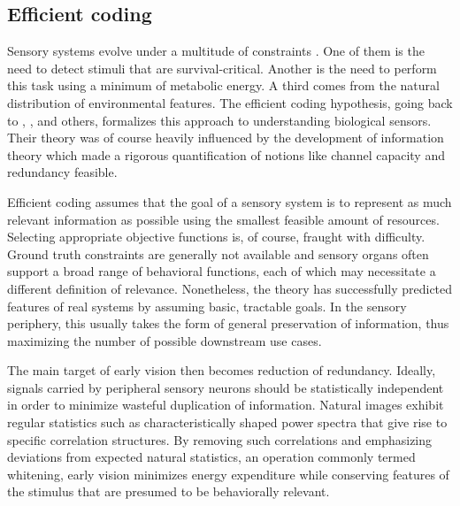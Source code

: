 \subsection{Efficient coding}
Sensory systems evolve under a multitude of constraints \citep{Sterling:2015aa}. One of them is the need to detect stimuli that are survival-critical. Another is the need to perform this task using a minimum of metabolic energy. A third comes from the natural distribution of environmental features. The efficient coding hypothesis, going back to \citet{Attneave:1954aa}, \citet{Barlow:1961aa}, and others, formalizes this approach to understanding biological sensors. Their theory was of course heavily influenced by the development of information theory which made a rigorous quantification of notions like channel capacity and redundancy feasible.

Efficient coding assumes that the goal of a sensory system is to represent as much relevant information as possible using the smallest feasible amount of resources. Selecting appropriate objective functions is, of course, fraught with difficulty. Ground truth constraints are generally not available and sensory organs often support a broad range of behavioral functions, each of which may necessitate a different definition of relevance. Nonetheless, the theory has successfully predicted features of real systems by assuming basic, tractable goals. In the sensory periphery, this usually takes the form of general preservation of information, thus maximizing the number of possible downstream use cases.

The main target of early vision then becomes reduction of redundancy. Ideally, signals carried by peripheral sensory neurons should be statistically independent in order to minimize wasteful duplication of information. Natural images exhibit regular statistics such as characteristically shaped power spectra that give rise to specific correlation structures. By removing such correlations and emphasizing deviations from expected natural statistics, an operation commonly termed whitening, early vision minimizes energy expenditure while conserving features of the stimulus that are presumed to be behaviorally relevant.

